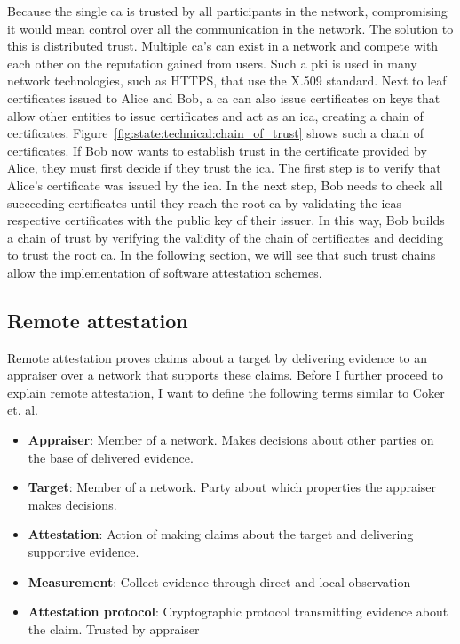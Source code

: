 Because the single \gls{ca} is trusted by all participants in the network,
compromising it would mean control over all the communication in the network.
The solution to this is distributed trust. Multiple \gls{ca}'s can exist in a
network and compete with each other on the reputation gained from
users.\cite{perlman1999overview} Such a \gls{pki} is used in many network
technologies, such as HTTPS, that use the X.509 standard. Next to leaf
certificates issued to Alice and Bob, a \gls{ca} can also issue certificates on
keys that allow other entities to issue certificates and act as an \gls{ica},
creating a chain of certificates.
Figure~\ref{fig:state:technical:chain_of_trust} shows such a chain of
certificates. If Bob now wants to establish trust in the certificate provided by
Alice, they must first decide if they trust the \gls{ica}. The first step is to
verify that Alice's certificate was issued by the \gls{ica}. In the next step,
Bob needs to check all succeeding certificates until they reach the root
\gls{ca} by validating the \glspl{ica} respective certificates with the public
key of their issuer. In this way, Bob builds a chain of trust by verifying the
validity of the chain of certificates and deciding to trust the root \gls{ca}.
In the following section, we will see that such trust chains allow the
implementation of software attestation schemes.

\subsection{Remote attestation}
\label{sec:20:remote_attestation}
Remote attestation proves claims about a target
by delivering evidence to an appraiser over a network that supports these
claims. Before I further proceed to explain remote attestation, I want to
define the following terms similar to Coker et. al.\cite{coker_principles_2011}
\begin{itemize}
    \item \textbf{Appraiser}: Member of a network. Makes decisions about other
          parties on the base of delivered evidence.
    \item \textbf{Target}: Member of a network. Party about which properties the
          appraiser makes decisions.
    \item \textbf{Attestation}: Action of making claims about the target and
          delivering supportive evidence.
    \item \textbf{Measurement}: Collect evidence through direct and local
          observation
    \item \textbf{Attestation protocol}: Cryptographic protocol transmitting
          evidence about the claim. Trusted by appraiser
\end{itemize}

